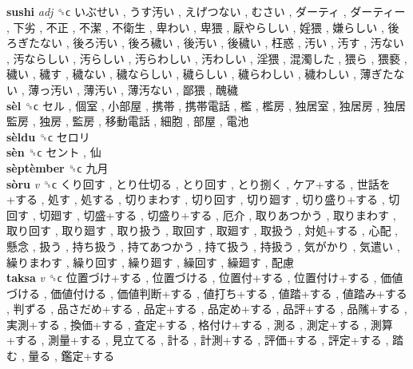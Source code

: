 \textbf{sushi} \emph{adj}  ␝ϲ   いぶせい ,  うす汚い ,  えげつない ,  むさい ,  ダーティ ,  ダーティー ,  下劣 ,  不正 ,  不潔 ,  不衛生 ,  卑わい ,  卑猥 ,  厭やらしい ,  婬猥 ,  嫌らしい ,  後ろぎたない ,  後ろ汚い ,  後ろ穢い ,  後汚い ,  後穢い ,  枉惑 ,  汚い ,  汚す ,  汚ない ,  汚ならしい ,  汚らしい ,  汚らわしい ,  汚わしい ,  淫猥 ,  混濁した ,  猥ら ,  猥褻 ,  穢い ,  穢す ,  穢ない ,  穢ならしい ,  穢らしい ,  穢らわしい ,  穢わしい ,  薄ぎたない ,  薄っ汚い ,  薄汚い ,  薄汚ない ,  鄙猥 ,  醜穢   \\
\textbf{sèl} ␝ϲ   セル ,  個室 ,  小部屋 ,  携帯 ,  携帯電話 ,  檻 ,  檻房 ,  独居室 ,  独居房 ,  独居監房 ,  独房 ,  監房 ,  移動電話 ,  細胞 ,  部屋 ,  電池   \\
\textbf{sèldu} ␝ϲ   セロリ   \\
\textbf{sèn} ␝ϲ   セント ,  仙   \\
\textbf{sèptèmber} ␝ϲ   九月   \\
\textbf{sòru} \emph{v}  ␝ϲ   くり回す ,  とり仕切る ,  とり回す ,  とり捌く ,  ケア+する ,  世話を+する ,  処す ,  処する ,  切りまわす ,  切り回す ,  切り廻す ,  切り盛り+する ,  切回す ,  切廻す ,  切盛+する ,  切盛り+する ,  厄介 ,  取りあつかう ,  取りまわす ,  取り回す ,  取り廻す ,  取り扱う ,  取回す ,  取廻す ,  取扱う ,  対処+する ,  心配 ,  懸念 ,  扱う ,  持ち扱う ,  持てあつかう ,  持て扱う ,  持扱う ,  気がかり ,  気遣い ,  繰りまわす ,  繰り回す ,  繰り廻す ,  繰回す ,  繰廻す ,  配慮   \\
\textbf{taksa} \emph{v}  ␝ϲ   位置づけ+する ,  位置づける ,  位置付+する ,  位置付け+する ,  価値づける ,  価値付ける ,  価値判断+する ,  値打ち+する ,  値踏+する ,  値踏み+する ,  判ずる ,  品さだめ+する ,  品定+する ,  品定め+する ,  品評+する ,  品隲+する ,  実測+する ,  換価+する ,  査定+する ,  格付け+する ,  測る ,  測定+する ,  測算+する ,  測量+する ,  見立てる ,  計る ,  計測+する ,  評価+する ,  評定+する ,  踏む ,  量る ,  鑑定+する   \\
